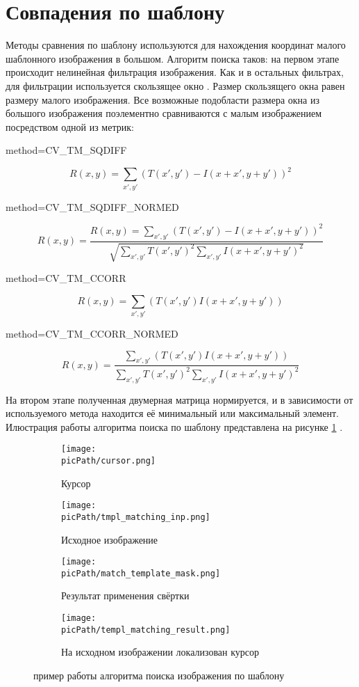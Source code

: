 \documentclass[oneside,final,14pt]{extreport}
\newcommand{\picPath}{pictures}
\begin{document}
\section{Совпадения по шаблону}
Методы сравнения по шаблону используются для нахождения координат малого шаблонного изображения в большом. Алгоритм поиска таков:
на первом этапе происходит нелинейная фильтрация изображения. Как и в остальных фильтрах, для фильтрации используется скользящее окно \cite{Dup:coursache}. Размер скользящего окна равен размеру малого изображения. Все возможные подобласти размера окна  из большого изображения поэлементно сравниваются с малым изображением посредством одной из метрик:   

\newpage
 method=CV\_TM\_SQDIFF

$$
R(x,y)
=
\sum_{x',y'}
(T(x',y')-I(x+x',y+y'))^2
$$ 

method=CV\_TM\_SQDIFF\_NORMED

$$
R(x,y)
=
\frac{
R(x,y)
=
\sum_{x',y'}
(T(x',y')-I(x+x',y+y'))^2
}
{
\sqrt{
	\sum_{x',y'}
	T(x',y')^2
	\sum_{x',y'}
	I(x+x',y+y')^2
	}
}
$$

method=CV\_TM\_CCORR

$$
R(x,y)
=
\sum_{x',y'}
( T(x',y')I(x+x',y+y'))
$$

method=CV\_TM\_CCORR\_NORMED

$$
R(x,y)
=
\frac{
	\sum_{x',y'}
	( T(x',y')I(x+x',y+y'))
}
{
	\sum_{x',y'}
	T(x',y')^2
	\sum_{x',y'}
	I(x+x',y+y')^2
}
$$

На втором этапе полученная двумерная матрица нормируется, и в зависимости от используемого метода находится её минимальный или максимальный элемент. Илюстрация работы алгоритма поиска по шаблону представлена на рисунке \ref{fig:templateMatching} .

\begin{figure}[H]
  \centering
  \begin{subfigure}[b]{0.2\linewidth}
    \texttt{[image: \\picPath/cursor.png]}
    \caption{ Курсор}
  \end{subfigure}
  \begin{subfigure}[b]{0.4\linewidth}
    \texttt{[image: \\picPath/tmpl\_matching\_inp.png]}
    \caption{Исходное изображение}
  \end{subfigure}
  \begin{subfigure}[b]{0.4\linewidth}
    \texttt{[image: \\picPath/match\_template\_mask.png]}
    \caption{Результат применения свёртки}
  \end{subfigure}
  \begin{subfigure}[b]{0.4\linewidth}
    \texttt{[image: \\picPath/templ\_matching\_result.png]}
    \caption{На исходном изображении локализован курсор}
  \end{subfigure}
  \caption{пример работы алгоритма поиска изображения по шаблону}
  \label{fig:templateMatching}
\end{figure}
\end{document}
